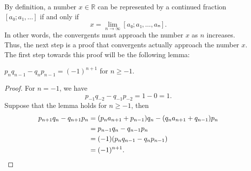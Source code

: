 \iffalse
\begin{figure}[tb]
  \centering
  
  \caption{
    The golden rectangle with side lengths $1$ and $φ$.
    Cutting of one unit square from the rectangle gives another rectangle with lengths $φ - 1$ and $1$.
    The ratio between the longer and shorter side remains the same.
  }
  \label{fig:golden-rectangle}
\end{figure}

\begin{example}
  Consider the golden ratio $φ$.
  It is the positive real root of the polynomial $p(x) = x^2 - x - 1$,
  which means that it satisfies $φ = 1 + 1/φ$.
  Since it is positive, we have $1 < φ = 1 + 1/φ < 2$ and $\floor{φ} = 1$.
  This makes the construction of the continued fraction particularly simple since
  \[
    φ = 1 + \cfrac{1}{1 + \cfrac{1}{1 + \cfrac{1}{⋱}}}.
  \]
  So the golden ratio $φ$ is represented by $[1; \overline{1}]$.
\end{example}

For the golden ratio, there is also a geometric interpretation via the golden
rectangle as shown in Figure~\ref{fig:golden-rectangle}.
The golden rectangle has side lengths of $1$ and $φ$,
and the Euclidean algorithm tries to remove as many unit squares inside the
golden rectangle as possible.
In this case, only one square is removed
and we get a new rectangle with side lengths $1$ and $φ - 1$.
But the ratios between the longer and shorter sides remain the same since
\[
  φ^2 - φ - 1 = 0 ⇔ φ(φ - 1) = 1 ⇔ \frac{φ}{1} = \frac{1}{φ - 1}.
\]
Therefore, in the next rectangle only one square of length $φ - 1$ will be
removed again.
\fi

By definition,
a number $x ∈ ℝ$ can be represented by a continued fraction $[a₀; a₁, …]$
if and only if
\[
  x = \lim_{n → ∞} [a₀; a₁, …, aₙ].
\]
In other words, the convergents must approach the number $x$ as $n$ increases.
Thus, the next step is a proof that convergents actually approach the number $x$.
The first step towards this proof will be the following lemma:

\begin{lemma}
  \label{lem:cf-det}
  $p_n q_{n-1} - q_n p_{n-1} = (-1)^{n+1}$ for $n ≥ -1$.
\end{lemma}

\begin{proof}
  For $n = -1$, we have
  \[
    p_{-1} q_{-2} - q_{-1} p_{-2} = 1 - 0 = 1.
  \]
  Suppose that the lemma holds for $n ≥ -1$, then
  \begin{align*}
    p_{n+1} q_n - q_{n+1} p_n
    & = (p_n a_{n+1} + p_{n-1}) q_n - (q_n a_{n+1} + q_{n-1}) p_n \\
    & = p_{n-1} q_n - q_{n-1} p_n \\
    & = (-1) (p_n q_{n-1} - q_n p_{n-1}) \\
    & = (-1)^{n+1}. \qedhere
  \end{align*}
\end{proof}

